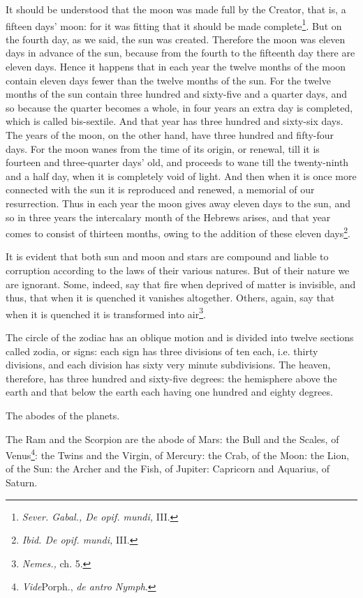 It should be understood that the moon was made full by the Creator, that is, a fifteen days’ moon: for it was fitting that it should be made complete\footnote{\emph{Sever. Gabal., De opif. mundi, }III.}. But on the fourth day, as we said, the sun was created. Therefore the moon was eleven days in advance of the sun, because from the fourth to the fifteenth day there are eleven days. Hence it happens that in each year the twelve months of the moon contain eleven days fewer than the twelve months of the sun. For the twelve months of the sun contain three hundred and sixty-five and a quarter days, and so because the quarter becomes a whole, in four years an extra day is completed, which is called bis-sextile. And that year has three hundred and sixty-six days. The years of the moon, on the other hand, have three hundred and fifty-four days. For the moon wanes from the time of its origin, or renewal, till it is fourteen and three-quarter days’ old, and proceeds to wane till the twenty-ninth and a half day, when it is completely void of light. And then when it is once more connected with the sun it is reproduced and renewed, a memorial of our resurrection. Thus in each year the moon gives away eleven days to the sun, and so in three years the intercalary month of the Hebrews arises, and that year comes to consist of thirteen months, owing to the addition of these eleven days\footnote{\emph{Ibid. De opif. mundi, }III.}.

It is evident that both sun and moon and stars are compound and liable to corruption according to the laws of their various natures. But of their nature we are ignorant. Some, indeed, say that fire when deprived of matter is invisible, and thus, that when it is quenched it vanishes altogether. Others, again, say that when it is quenched it is transformed into air\footnote{\emph{Nemes., }ch. 5.}.

The circle of the zodiac has an oblique motion and is divided into twelve sections called zodia, or signs: each sign has three divisions of ten each, i.e. thirty divisions, and each division has sixty very minute subdivisions. The heaven, therefore, has three hundred and sixty-five degrees: the hemisphere above the earth and that below the earth each having one hundred and eighty degrees.

The abodes of the planets.

The Ram and the Scorpion are the abode of Mars: the Bull and the Scales, of Venus\footnote{\emph{Vide}Porph., \emph{de antro Nymph}.}: the Twins and the Virgin, of Mercury: the Crab, of the Moon: the Lion, of the Sun: the Archer and the Fish, of Jupiter: Capricorn and Aquarius, of Saturn.

